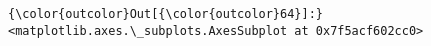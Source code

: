 \documentclass[11pt]{article}
\begin{document}
\begin{Verbatim}[commandchars=\\\{\}]
{\color{outcolor}Out[{\color{outcolor}64}]:} <matplotlib.axes.\_subplots.AxesSubplot at 0x7f5acf602cc0>
\end{Verbatim}
            
    \begin{center}
    \end{center}
    { \hspace*{\fill} \\}
    

    
    
    
    
\end{document}

